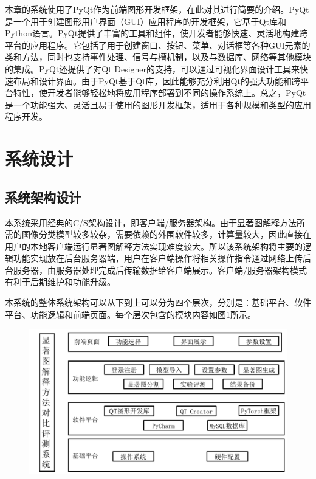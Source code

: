 本章的系统使用了PyQt作为前端图形开发框架，在此对其进行简要的介绍。PyQt是一个用于创建图形用户界面（GUI）应用程序的开发框架，它基于Qt库和Python语言。PyQt提供了丰富的工具和组件，使开发者能够快速、灵活地构建跨平台的应用程序。它包括了用于创建窗口、按钮、菜单、对话框等各种GUI元素的类和方法，同时也支持事件处理、信号与槽机制，以及与数据库、网络等其他模块的集成。PyQt还提供了对Qt Designer的支持，可以通过可视化界面设计工具来快速布局和设计界面。由于PyQt基于Qt库，因此能够充分利用Qt的强大功能和跨平台特性，使开发者能够轻松地将应用程序部署到不同的操作系统上。总之，PyQt是一个功能强大、灵活且易于使用的图形开发框架，适用于各种规模和类型的应用程序开发。

\section{系统设计}
\subsection{系统架构设计}
本系统采用经典的C/S架构设计，即客户端/服务器架构。由于显著图解释方法所需的图像分类模型较多较杂，需要依赖的外围软件较多，计算量较大，因此直接在用户的本地客户端运行显著图解释方法实现难度较大。所以该系统架构将主要的逻辑功能实现放在后台服务器端，用户在客户端操作将相关操作指令通过网络上传后台服务器，由服务器处理完成后传输数据给客户端展示。客户端/服务器架构模式有利于后期维护和功能升级。

本系统的整体系统架构可以从下到上可以分为四个层次，分别是：基础平台、软件平台、功能逻辑和前端页面。每个层次包含的模块内容如图\ref{fig:sys}所示。

\begin{figure}[h]
	\centering 
	\includegraphics[width=15cm]{fig/ch5/sys.png}
	\label{fig:sys}
\end{figure}
